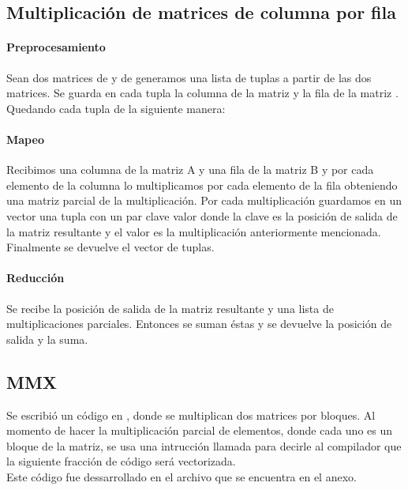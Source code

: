 \subsection{Multiplicación de matrices de columna por fila}

    \paragraph{Preprocesamiento}

        Sean dos matrices  de  y  de 
        generamos una lista de tuplas a partir de las dos matrices.
        Se guarda en cada tupla la columna  de la matriz  y
        la fila  de la matriz . Quedando cada tupla de la
        siguiente manera:\\

    \paragraph{Mapeo}
        Recibimos una columna de la matriz A y una fila de la matriz B y por cada
        elemento de la columna  lo multiplicamos por cada elemento
        de la fila  obteniendo una matriz parcial de la
        multiplicación. Por cada multiplicación guardamos en un vector una tupla
        con un par clave valor donde la clave es la posición de salida de la matriz
        resultante y el valor es la multiplicación anteriormente mencionada.
        Finalmente se devuelve el vector de tuplas.

    \paragraph{Reducción}

        Se recibe la posición de salida de la matriz resultante y una lista de
        multiplicaciones parciales. Entonces se suman éstas y se devuelve la
        posición de salida y la suma.

\subsection{MMX}
    Se escribió un código en , donde se multiplican dos matrices
    por bloques. Al momento de hacer la multiplicación parcial de elementos, donde
    cada uno es un bloque de la matriz, se usa una intrucción llamada
     para decirle al  compilador que la siguiente
    fracción de código será vectorizada.\\
    Este código fue dessarrollado en el archivo  que
    se encuentra en el anexo.

